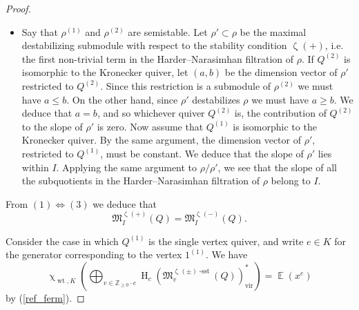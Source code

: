 \documentclass{amsart}
\newcommand{\Mst}{\mathfrak{M}}
\DeclareMathOperator{\Wt}{wt}
\DeclareMathOperator{\HO}{H}
\DeclareMathOperator{\sstable}{-sst}
\DeclareMathOperator{\vir}{vir}
\DeclareMathOperator{\EE}{\mathbb{E}}
\renewcommand{\zeta}{\upzeta}
\renewcommand{\chi}{\upchi}
\theoremstyle{plain}%
\theoremstyle{definition}
\theoremstyle{remark}
\begin{document}
\begin{proof}
\begin{itemize}
    \item[$(2)\Rightarrow (3)$] Say that $\rho^{(1)}$ and $\rho^{(2)}$ are semistable.  Let $\rho'\subset \rho$ be the maximal destabilizing submodule with respect to the stability condition $\zeta(+)$, i.e. the first non-trivial term in the Harder--Narasimhan filtration of $\rho$.  If $Q^{(2)}$ is isomorphic to the Kronecker quiver, let $(a,b)$ be the dimension vector of $\rho'$ restricted to $Q^{(2)}$.  Since this restriction is a submodule of $\rho^{(2)}$ we must have $a\leq b$.  On the other hand, since $\rho'$ destabilizes $\rho$ we must have $a\geq b$.  We deduce that $a=b$, and so whichever quiver $Q^{(2)}$ is, the contribution of $Q^{(2)}$ to the slope of $\rho'$ is zero.  Now assume that $Q^{(1)}$ is isomorphic to the Kronecker quiver.  By the same argument, the dimension vector of $\rho'$, restricted to $Q^{(1)}$, must be constant.  We deduce that the slope of $\rho'$ lies within $I$.  Applying the same argument to $\rho/\rho'$, we see that the slope of all the subquotients in the Harder--Narasimhan filtration of $\rho$ belong to $I$.
\end{itemize}

From $(1)\Leftrightarrow (3)$ we deduce that
\begin{equation}
\label{zeta_ind}
\Mst^{\zeta(+)}_I(Q)=\Mst^{\zeta(-)}_I(Q).
\end{equation}

Consider the case in which $Q^{(1)}$ is the single vertex quiver, and write $e\in K$ for the generator corresponding to the vertex $1^{(1)}$.  We have
\[
\chi_{\Wt,K}\left(\bigoplus_{v\in \mathbb{Z}_{\geq 0}\cdot e}\HO_c(\Mst^{\zeta(\pm)\sstable}_{v}(Q))_{\vir}^*\right)=\EE(x^{e})
\]
by (\ref{ref_ferm}).


\end{proof}
\end{document}
